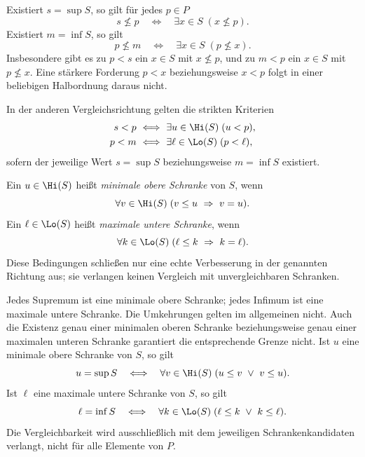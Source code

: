 \begin{theorem}
\label{b13guide:thm:witnesses}
Existiert $s=\sup S$, so gilt für jedes $p\in P$
\[
 s\nleq p\quad\Longleftrightarrow\quad
       \exists x\in S\;(x\nleq p).
\]
Existiert $m=\inf S$, so gilt
\[
 p\nleq m\quad\Longleftrightarrow\quad
       \exists x\in S\;(p\nleq x).
\]
Insbesondere gibt es zu $p<s$ ein $x\in S$ mit $x\nleq p$,
und zu $m<p$ ein $x\in S$ mit $p\nleq x$.
Eine stärkere Forderung $p<x$ beziehungsweise $x<p$ folgt
in einer beliebigen Halbordnung daraus nicht.

In der anderen Vergleichsrichtung gelten die strikten Kriterien
\[
\begin{aligned}
 s<p&\ \Longleftrightarrow\ \exists u\in\Hi(S)\;(u<p),\\
 p<m&\ \Longleftrightarrow\ \exists\ell\in\Lo(S)\;(p<\ell),
\end{aligned}
\]
sofern der jeweilige Wert $s=\sup S$ beziehungsweise $m=\inf S$
existiert.

\end{theorem}


\begin{definition}
\label{b13guide:def:minimal-bound}
Ein $u\in\Hi(S)$ heißt \emph{minimale obere Schranke} von $S$, wenn
\[
 \forall v\in\Hi(S)\;(v\leq u\ \Rightarrow\ v=u).
\]
Ein $\ell\in\Lo(S)$ heißt \emph{maximale untere Schranke}, wenn
\[
 \forall k\in\Lo(S)\;(\ell\leq k\ \Rightarrow\ k=\ell).
\]
Diese Bedingungen schließen nur eine echte Verbesserung in der
genannten Richtung aus; sie verlangen keinen Vergleich mit
unvergleichbaren Schranken.
\end{definition}

\begin{theorem}
\label{b13guide:thm:minimal-bound}
Jedes Supremum ist eine minimale obere Schranke; jedes Infimum
ist eine maximale untere Schranke. Die Umkehrungen gelten im
allgemeinen nicht. Auch die Existenz genau einer minimalen oberen
Schranke beziehungsweise genau einer maximalen unteren Schranke
garantiert die entsprechende Grenze nicht.
Ist $u$ eine minimale obere Schranke von $S$, so gilt
\[
 u=\sup S\quad\Longleftrightarrow\quad
 \forall v\in\Hi(S)\;(u\leq v\ \lor\ v\leq u).
\]
Ist $\ell$ eine maximale untere Schranke von $S$, so gilt
\[
 \ell=\inf S\quad\Longleftrightarrow\quad
 \forall k\in\Lo(S)\;(\ell\leq k\ \lor\ k\leq\ell).
\]
Die Vergleichbarkeit wird ausschließlich mit dem jeweiligen
Schrankenkandidaten verlangt, nicht für alle Elemente von $P$.
\end{theorem}

